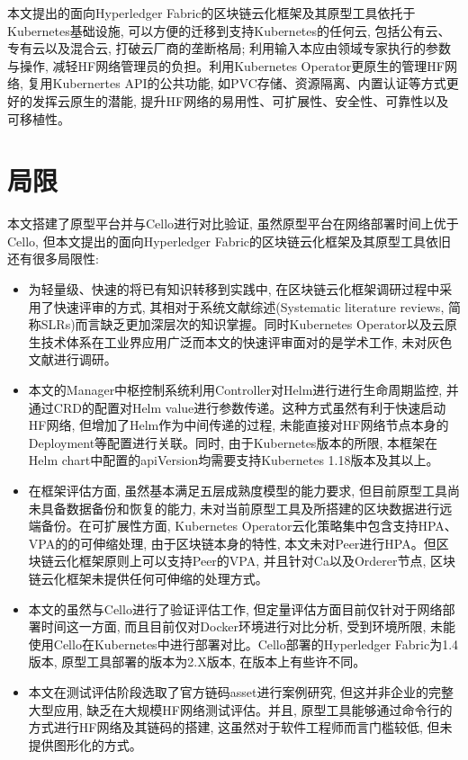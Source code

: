 本文提出的面向Hyperledger Fabric的区块链云化框架及其原型工具依托于Kubernetes基础设施, 可以方便的迁移到支持Kubernetes的任何云, 包括公有云、专有云以及混合云, 打破云厂商的垄断格局; 利用输入本应由领域专家执行的参数与操作, 减轻HF网络管理员的负担。利用Kubernetes Operator更原生的管理HF网络, 复用Kubernertes API的公共功能, 如PVC存储、资源隔离、内置认证等方式更好的发挥云原生的潜能, 提升HF网络的易用性、可扩展性、安全性、可靠性以及可移植性。

\section{局限}

本文搭建了原型平台并与Cello进行对比验证, 虽然原型平台在网络部署时间上优于Cello, 但本文提出的面向Hyperledger Fabric的区块链云化框架及其原型工具依旧还有很多局限性:

\begin{itemize}[itemindent=2em]
    \item 为轻量级、快速的将已有知识转移到实践中, 在区块链云化框架调研过程中采用了快速评审的方式, 其相对于系统文献综述(Systematic literature reviews, 简称SLRs)而言缺乏更加深层次的知识掌握。同时Kubernetes Operator以及云原生技术体系在工业界应用广泛而本文的快速评审面对的是学术工作, 未对灰色文献进行调研。

    \item 本文的Manager中枢控制系统利用Controller对Helm进行进行生命周期监控, 并通过CRD的配置对Helm value进行参数传递。这种方式虽然有利于快速启动HF网络, 但增加了Helm作为中间传递的过程, 未能直接对HF网络节点本身的Deployment等配置进行关联。同时, 由于Kubernetes版本的所限, 本框架在Helm chart中配置的apiVersion均需要支持Kubernetes 1.18版本及其以上。

    \item 在框架评估方面, 虽然基本满足五层成熟度模型的能力要求, 但目前原型工具尚未具备数据备份和恢复的能力, 未对当前原型工具及所搭建的区块数据进行远端备份。在可扩展性方面, Kubernetes Operator云化策略集中包含支持HPA、VPA的的可伸缩处理, 由于区块链本身的特性, 本文未对Peer进行HPA。但区块链云化框架原则上可以支持Peer的VPA, 并且针对Ca以及Orderer节点, 区块链云化框架未提供任何可伸缩的处理方式。

    \item 本文的虽然与Cello进行了验证评估工作, 但定量评估方面目前仅针对于网络部署时间这一方面, 而且目前仅对Docker环境进行对比分析, 受到环境所限, 未能使用Cello在Kubernetes中进行部署对比。Cello部署的Hyperledger Fabric为1.4版本, 原型工具部署的版本为2.X版本, 在版本上有些许不同。

    \item 本文在测试评估阶段选取了官方链码asset进行案例研究, 但这并非企业的完整大型应用, 缺乏在大规模HF网络测试评估。并且, 原型工具能够通过命令行的方式进行HF网络及其链码的搭建, 这虽然对于软件工程师而言门槛较低, 但未提供图形化的方式。

\end{itemize}



